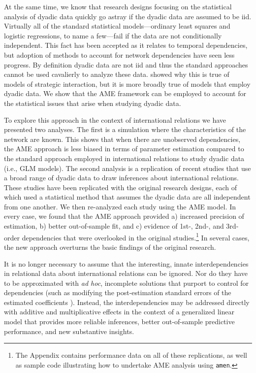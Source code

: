 At the same time, we know that research designs focusing on the statistical analysis of dyadic data quickly go astray if the dyadic data are assumed to be iid.  Virtually all of the standard statistical models---ordinary least squares and logistic regressions, to name a few---fail if the data are not conditionally independent. This fact has been accepted as it relates to temporal dependencies, but adoption of methods to account for network dependencies have seen less progress. By definition dyadic data are not iid and thus the standard approaches cannot be used cavalierly to analyze these data.  \citet{signorino:1999} showed why this is true of models of strategic interaction, but it is more broadly true of models that employ dyadic data.  We show that the AME framework can be employed to account for the statistical issues that arise when studying dyadic data.

To explore this approach in the context of international relations we have presented two analyses. The first is a simulation where the characteristics of the network are known. This shows that when there are unobserved dependencies, the AME approach is less biased in terms of parameter estimation compared to the standard approach employed in international relations to study dyadic data (i.e., GLM models). The second analysis is a replication of recent studies that use a broad range of dyadic data to draw inferences about international relations.  These studies have been replicated with the original research designs, each of which used a statistical method that assumes the dyadic data are all independent from one another.  We then re-analyzed each study using the AME model.  In every case, we found that the AME approach provided a) increased precision of estimation, b) better out-of-sample fit, and c) evidence of 1st-, 2nd-, and 3rd-order dependencies that were overlooked in the original studies.\footnote{The Appendix contains performance data on all of these replications, as well as sample code illustrating how to undertake AME analysis using \texttt{amen}.} In several cases, the new approach overturns the basic findings of the original research.

It is no longer necessary to assume that the interesting, innate interdependencies in relational data about international relations can be ignored. Nor do they have to be approximated with \textit{ad hoc}, incomplete solutions that purport to control for dependencies (such as modifying the post-estimation standard errors of the estimated coefficients \citep{king:roberts:2014}). Instead, the interdependencies may be addressed directly with additive and multiplicative effects in the context of a generalized linear model that provides more reliable inferences, better out-of-sample predictive performance, and new substantive insights. 